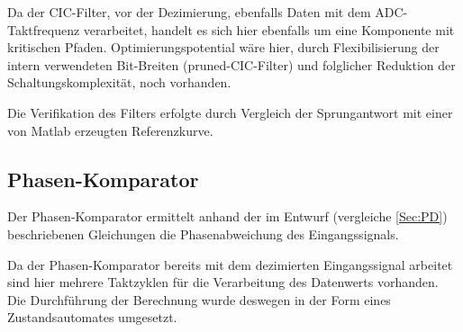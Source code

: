 Da der \acs{CIC}-Filter, vor der Dezimierung, ebenfalls Daten mit dem \acs{ADC}-Taktfrequenz verarbeitet, handelt es sich hier ebenfalls um eine Komponente mit kritischen Pfaden.
Optimierungspotential wäre hier, durch Flexibilisierung der intern verwendeten Bit-Breiten (pruned-\acs{CIC}-Filter) und folglicher Reduktion der Schaltungskomplexität, noch vorhanden.

Die Verifikation des Filters erfolgte durch Vergleich der Sprungantwort mit einer von Matlab erzeugten Referenzkurve.

\subsection{Phasen-Komparator}
Der Phasen-Komparator ermittelt anhand der im Entwurf (vergleiche \ref{Sec:PD}) beschriebenen Gleichungen die Phasenabweichung des Eingangssignals.

Da der Phasen-Komparator bereits mit dem dezimierten Eingangssignal arbeitet sind hier mehrere Taktzyklen für die Verarbeitung des Datenwerts vorhanden.
Die Durchführung der Berechnung wurde deswegen in der Form eines Zustandsautomates umgesetzt.


